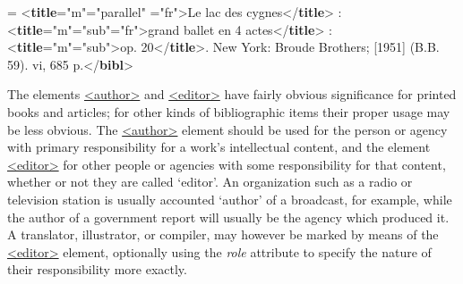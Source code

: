 \begin{shaded}
 = {<\textbf{title}\hspace*{1em}{level}="{m}"\hspace*{1em}{type}="{parallel}"\mbox{}\newline 
\hspace*{1em}\hspace*{1em}{xml:lang}="{fr}">}Le lac des cygnes{</\textbf{title}>}\mbox{}\newline 
 : {<\textbf{title}\hspace*{1em}{level}="{m}"\hspace*{1em}{type}="{sub}"\hspace*{1em}{xml:lang}="{fr}">}grand ballet en 4 actes{</\textbf{title}>}\mbox{}\newline 
 : {<\textbf{title}\hspace*{1em}{level}="{m}"\hspace*{1em}{type}="{sub}">}op. 20{</\textbf{title}>}\mbox{}\newline 
 [Score].\mbox{}\newline 
 New York: Broude Brothers; [1951] (B.B. 59). vi, 685 p.{</\textbf{bibl}>}\end{shaded}\egroup\par \noindent  \par
The elements \hyperref[TEI.author]{<author>} and \hyperref[TEI.editor]{<editor>} have fairly obvious significance for printed books and articles; for other kinds of bibliographic items their proper usage may be less obvious. The \hyperref[TEI.author]{<author>} element should be used for the person or agency with primary responsibility for a work's intellectual content, and the element \hyperref[TEI.editor]{<editor>} for other people or agencies with some responsibility for that content, whether or not they are called ‘editor’. An organization such as a radio or television station is usually accounted ‘author’ of a broadcast, for example, while the author of a government report will usually be the agency which produced it. A translator, illustrator, or compiler, may however be marked by means of the \hyperref[TEI.editor]{<editor>} element, optionally using the {\itshape role} attribute to specify the nature of their responsibility more exactly.\par
